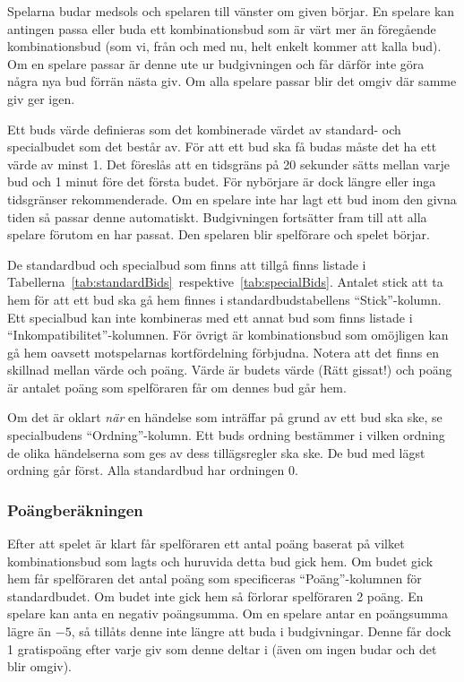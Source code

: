 \documentclass[a4paper]{article}
\begin{document}
				Spelarna budar medsols och spelaren till vänster om given börjar. En spelare kan antingen passa eller buda ett kombinationsbud som är värt mer än föregående kombinationsbud (som vi, från och med nu, helt enkelt kommer att kalla bud). Om en spelare passar är denne ute ur budgivningen och får därför inte göra några nya bud förrän nästa giv. Om alla spelare passar blir det omgiv där samme giv ger igen.

				Ett buds värde definieras som det kombinerade värdet av standard- och specialbudet som det består av. För att ett bud ska få budas måste det ha ett värde av minst 1. Det föreslås att en tidsgräns på 20 sekunder sätts mellan varje bud och 1 minut före det första budet. För nybörjare är dock längre eller inga tidsgränser rekommenderade. Om en spelare inte har lagt ett bud inom den givna tiden så passar denne automatiskt. Budgivningen fortsätter fram till att alla spelare förutom en har passat. Den spelaren blir spelförare och spelet börjar.

				De standardbud och specialbud som finns att tillgå finns listade i Tabellerna~\ref{tab:standardBids}~respektive~\ref{tab:specialBids}. Antalet stick att ta hem för att ett bud ska gå hem finnes i standardbudstabellens ``Stick''-kolumn. Ett specialbud kan inte kombineras med ett annat bud som finns listade i ``Inkompatibilitet''-kolumnen. För övrigt är kombinationsbud som omöjligen kan gå hem oavsett motspelarnas kortfördelning förbjudna. Notera att det finns en skillnad mellan värde och poäng. Värde är budets värde (Rätt gissat!) och poäng är antalet poäng som spelföraren får om dennes bud går hem.

				Om det är oklart \emph{när} en händelse som inträffar på grund av ett bud ska ske, se specialbudens ``Ordning''-kolumn. Ett buds ordning bestämmer i vilken ordning de olika händelserna som ges av dess tillägsregler ska ske. De bud med lägst ordning går först. Alla standardbud har ordningen 0.

			\subsubsection{Poängberäkningen}
				Efter att spelet är klart får spelföraren ett antal poäng baserat på vilket kombinationsbud som lagts och huruvida detta bud gick hem. Om budet gick hem får spelföraren det antal poäng som specificeras ``Poäng''-kolumnen för standardbudet. Om budet inte gick hem så förlorar spelföraren 2 poäng. En spelare kan anta en negativ poängsumma. Om en spelare antar en poängsumma lägre än $-5$, så tillåts denne inte längre att buda i budgivningar. Denne får dock 1 gratispoäng efter varje giv som denne deltar i (även om ingen budar och det blir omgiv).
\end{document}
